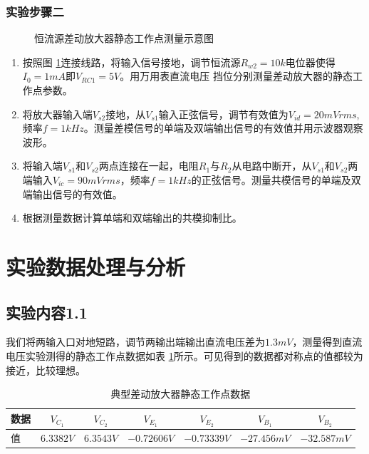 \documentclass[a4paper,11pt,UTF8]{ctexart}
\begin{document}
	\subsubsection{实验步骤二}
	\begin{figure}[htbp]
		\centering
		\caption{恒流源差动放大器静态工作点测量示意图}
		\label{fig:sStatic}
	\end{figure}
	\begin{enumerate}
		\item 按照图 \ref{fig:sStatic}连接线路，将输入信号接地，调节恒流源$R_{w2}=10k$电位器使得$I_0=1mA$即$V_{RC1}=5V$。用万用表直流电压
		挡位分别测量差动放大器的静态工作点参数。
		\item 将放大器输入端$V_{s2}$接地，从$V_{s1}$输入正弦信号，调节有效值为$V_{id}=20mVrms$,频率$f=1kHz$。测量差模信号的单端及双端输出信号的有效值并用示波器观察波形。
		\item 将输入端$V_{s1}$和$V_{s2}$两点连接在一起，电阻$R_1$与$R_2$从电路中断开，从$V_{s1}$和$V_{s2}$两端输入$V_{ic}=90mVrms$，频率$f=1kHz$的正弦信号。测量共模信号的单端及双端输出信号的有效值。
		\item 根据测量数据计算单端和双端输出的共模抑制比。
	\end{enumerate}
	
	\section{实验数据处理与分析}
	\subsection{实验内容1.1}
	我们将两输入口对地短路，调节两输出端输出直流电压差为$1.3mV$，测量得到直流电压实验测得的静态工作点数据如表 \ref{tab:nSTab}所示。可见得到的数据都对称点的值都较为接近，比较理想。
	\begin{table}[!h!tbp]
		\caption{典型差动放大器静态工作点数据}\label{tab:nSTab}
		\centering
		\begin{tabular}{|l|c|c|c|c|c|c|}
			\hline
			数据 &$V_{C_1}$&$V_{C_2}$&$V_{E_1}$&$V_{E_2}$&$V_{B_1}$&$V_{B_2}$         \\ \hline
			值   &$6.3382V$&$6.3543V$&$-0.72606V$&$-0.73339V$&$-27.456mV$&$-32.587mV$     \\ \hline
		\end{tabular}
	\end{table}
\end{document}

